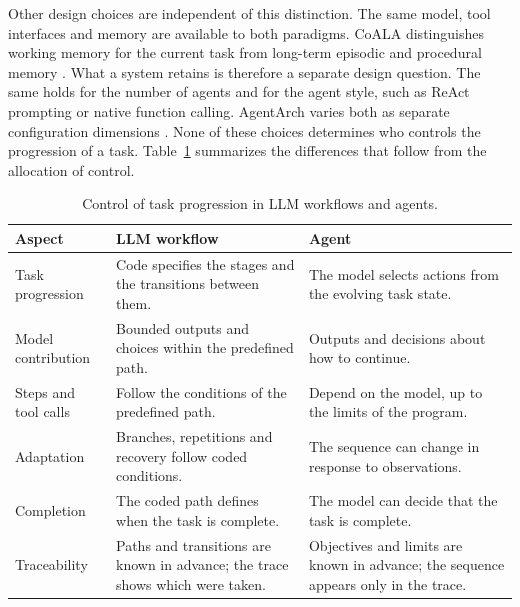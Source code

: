 Other design choices are independent of this distinction. The same model, tool interfaces and memory are available to both paradigms. CoALA distinguishes working memory for the current task from long-term episodic and procedural memory \parencite{sumersCognitiveArchitecturesLanguage2024}. What a system retains is therefore a separate design question. The same holds for the number of agents and for the agent style, such as ReAct prompting or native function calling. AgentArch varies both as separate configuration dimensions \parencite{bogavelliAgentArchComprehensiveBenchmark2025}. None of these choices determines who controls the progression of a task. Table~\ref{tab:theory-workflow-agent} summarizes the differences that follow from the allocation of control.

\begin{table}[htbp]
  \centering
  \caption{Control of task progression in LLM workflows and agents.}
  \label{tab:theory-workflow-agent}
  \small
  \begin{tabular}{@{}>{\raggedright\arraybackslash}p{} >{\raggedright\arraybackslash}p{} >{\raggedright\arraybackslash}p{}@{}}
    \toprule
    \textbf{Aspect} & \textbf{LLM workflow} & \textbf{Agent} \\
    \midrule
    Task progression & Code specifies the stages and the transitions between them. & The model selects actions from the evolving task state. \\
    \addlinespace[2pt]
    Model contribution & Bounded outputs and choices within the predefined path. & Outputs and decisions about how to continue. \\
    \addlinespace[2pt]
    Steps and tool calls & Follow the conditions of the predefined path. & Depend on the model, up to the limits of the program. \\
    \addlinespace[2pt]
    Adaptation & Branches, repetitions and recovery follow coded conditions. & The sequence can change in response to observations. \\
    \addlinespace[2pt]
    Completion & The coded path defines when the task is complete. & The model can decide that the task is complete. \\
    \addlinespace[2pt]
    Traceability & Paths and transitions are known in advance; the trace shows which were taken. & Objectives and limits are known in advance; the sequence appears only in the trace. \\
    \bottomrule
  \end{tabular}
\end{table}

